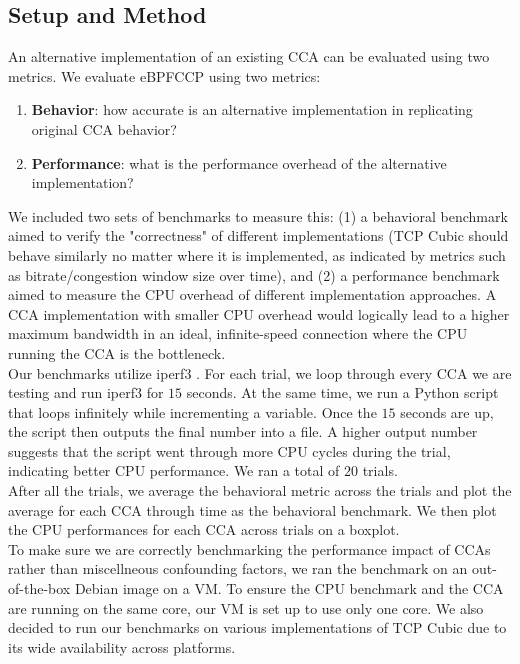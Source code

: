 \documentclass[../main.tex]{subfiles}
\begin{document}
\subsection{Setup and Method}
An alternative implementation of an existing CCA can be evaluated using two metrics.
We evaluate eBPFCCP using two metrics:
\begin{enumerate}
    \item {\bf Behavior}: how accurate is an alternative implementation in replicating original CCA behavior?
    \item {\bf Performance}: what is the performance overhead of the alternative implementation?
\end{enumerate}

We included two sets of benchmarks to measure this: (1) a behavioral benchmark aimed to verify the "correctness" of different implementations (TCP Cubic should behave similarly no matter where it is implemented, as indicated by metrics such as bitrate/congestion window size over time), and (2) a performance benchmark aimed to measure the CPU overhead of different implementation approaches. A CCA implementation with smaller CPU overhead would logically lead to a higher maximum bandwidth in an ideal, infinite-speed connection where the CPU running the CCA is the bottleneck. \\
Our benchmarks utilize iperf3 \cite{iperf}. For each trial, we loop through every CCA we are testing and run iperf3 for $15$ seconds. At the same time, we run a Python script that loops infinitely while incrementing a variable. Once the $15$ seconds are up, the script then outputs the final number into a file. A higher output number suggests that the script went through more CPU cycles during the trial, indicating better CPU performance. We ran a total of $20$ trials. \\
After all the trials, we average the behavioral metric across the trials and plot the average for each CCA through time as the behavioral benchmark. We then plot the CPU performances for each CCA across trials on a boxplot. \\
To make sure we are correctly benchmarking the performance impact of CCAs rather than miscellneous confounding factors, we ran the benchmark on an out-of-the-box Debian image on a VM. To ensure the CPU benchmark and the CCA are running on the same core, our VM is set up to use only one core. We also decided to run our benchmarks on various implementations of TCP Cubic due to its wide availability across platforms.
\end{document}
